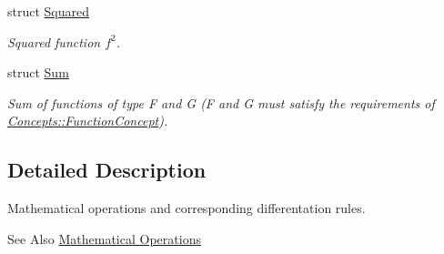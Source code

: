 \begin{DoxyCompactItemize}
struct \hyperlink{structfuncy_1_1MathematicalOperations_1_1Squared}{Squared}
\begin{DoxyCompactList}\small\item\em Squared function $f^2$. \end{DoxyCompactList}\item 
struct \hyperlink{structfuncy_1_1MathematicalOperations_1_1Sum}{Sum}
\begin{DoxyCompactList}\small\item\em Sum of functions of type F and G (F and G must satisfy the requirements of \hyperlink{structfuncy_1_1Concepts_1_1FunctionConcept}{Concepts\-::\-Function\-Concept}). \end{DoxyCompactList}\end{DoxyCompactItemize}


\subsection{Detailed Description}
Mathematical operations and corresponding differentation rules. \begin{DoxySeeAlso}{See Also}
\hyperlink{group__MathematicalOperationsGroup}{Mathematical Operations} 
\end{DoxySeeAlso}
